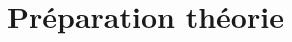\documentclass[Deriaz_Traiber_Labo02]{subfiles}
\begin{document}
\section{Préparation théorie}
\end{document}
